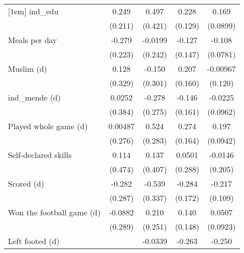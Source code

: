 {\begin{tabular}{l*{4}{c}}
[1em]
ind\_edu             &       0.249         &       0.497         &       0.228\sym{*}  &       0.169\sym{*}  \\
                    &     (0.211)         &     (0.421)         &     (0.129)         &    (0.0899)         \\
[1em]
Meals per day       &      -0.279         &     -0.0199         &      -0.127         &      -0.108         \\
                    &     (0.223)         &     (0.242)         &     (0.147)         &    (0.0781)         \\
[1em]
Muslim (d)          &       0.128         &      -0.150         &       0.207         &    -0.00967         \\
                    &     (0.329)         &     (0.301)         &     (0.160)         &     (0.120)         \\
[1em]
ind\_mende (d)       &      0.0252         &      -0.278         &      -0.146         &     -0.0225         \\
                    &     (0.384)         &     (0.275)         &     (0.161)         &    (0.0962)         \\
[1em]
Played whole game (d)&     0.00487         &       0.524\sym{*}  &       0.274\sym{*}  &       0.197\sym{**} \\
                    &     (0.276)         &     (0.283)         &     (0.164)         &    (0.0942)         \\
[1em]
Self-declared skills&       0.114         &       0.137         &      0.0501         &     -0.0146         \\
                    &     (0.474)         &     (0.407)         &     (0.288)         &     (0.205)         \\
[1em]
Scored (d)          &      -0.282         &      -0.539         &      -0.284\sym{*}  &      -0.217\sym{**} \\
                    &     (0.287)         &     (0.337)         &     (0.172)         &     (0.109)         \\
[1em]
Won the football game (d)&     -0.0882         &       0.210         &       0.140         &      0.0507         \\
                    &     (0.289)         &     (0.251)         &     (0.148)         &    (0.0923)         \\
[1em]
Left footed (d)     &                     &     -0.0339         &      -0.263\sym{**} &      -0.250\sym{***}\\

\end{tabular}}
